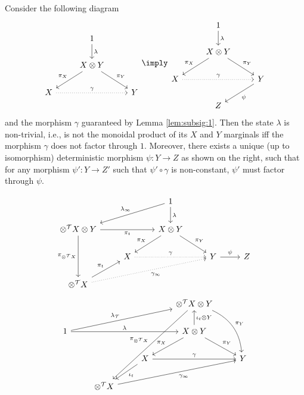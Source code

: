 \documentclass[12pt,oneside,pb-diagram]{article}
\begin{document}
\begin{lemma}  \label{lem:dij03}
	Consider the following diagram
	\begin{equation} \label{eqn:dij03}
		\begin{tikzcd}
			& 1 \arrow[d, "\lambda"] &  \\
			& X\otimes Y \arrow[ld, "\pi_X"'] \arrow[rd, "\pi_Y"] &  \\
			X \arrow[rr, dotted, "\gamma"] & & Y
		\end{tikzcd}
		\imply
		\begin{tikzcd}
			& 1 \arrow[d, "\lambda"] &  \\
			& X\otimes Y \arrow[ld, "\pi_X"'] \arrow[rd, "\pi_Y"] &  \\
			X \arrow[rr, "\gamma", dotted] &  & Y \arrow[ld, "\psi"] \\
			& Z & 
		\end{tikzcd}
	\end{equation}
	and the morphism $\gamma$ guaranteed by Lemma \ref{lem:subsig:1}.
	Then the state $\lambda$ is non-trivial, i.e., is not the monoidal product of its $X$ and $Y$ marginals iff the morphism $\gamma$ does not factor through $1$. Moreover, there exists a unique (up to isomorphism) deterministic morphism $\psi : Y \to Z$ as shown on the right, such that for any morphism $\psi' : Y \to Z'$  such that $\psi' \circ \gamma$ is non-constant, $\psi'$ must factor through $\psi$.
\end{lemma}
%
\begin{equation}
	\begin{tikzcd}
		&  & 1 \arrow[d, "\lambda"] \arrow[lld, "\lambda_{\infty}"'] &  &  \\
		\otimes^{\Time} X \otimes Y \arrow[dd, "\pi_{\otimes^{\Time} X}"'] \arrow[rr, "\pi_t"'] &  & X \otimes Y \arrow[ld, "\pi_X"'] \arrow[rd, "\pi_Y"] &  &  \\
		& X \arrow[rr, "\gamma", dotted] &  & Y \arrow[r, "\psi"] & Z \\
		\otimes^{\Time} X \arrow[rrru, "\gamma_{\infty}"', dotted] \arrow[ru, "\pi_t"] &  &  &  & 
	\end{tikzcd}
\end{equation}
%
%
\begin{equation}
	\begin{tikzcd}
		&  &  & \otimes^{\Time} X \otimes Y \arrow[rdd, "\pi_Y", bend left] \arrow[llddd, "\pi_{\otimes^{\Time} X}"'] &  \\
		1 \arrow[rrr, "\lambda"] \arrow[rrru, "\lambda_{\Time}"] &  &  & X \otimes Y \arrow[rd, "\pi_Y"] \arrow[ld, "\pi_X"'] \arrow[u, "\iota_t \otimes Y"'] &  \\
		&  & X \arrow[rr, "\gamma"] \arrow[ld, "\iota_t"] &  & Y \\
		& \otimes^{\Time} X \arrow[rrru, "\gamma_{\infty}"'] &  &  & 
	\end{tikzcd}
\end{equation}
\end{document}
